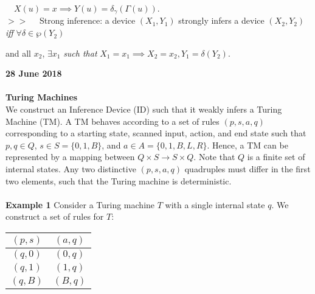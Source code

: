 \documentclass[11pt]{article}
\begin{document}
$ \quad X(u) = x \implies Y(u) = \delta_{\gamma}(\Gamma(u)) $.  \\
$ >> \quad $ Strong inference: a device $ (X_1, Y_1) $ strongly infers a device $ (X_2, Y_2) $ \textit{ iff } $\forall \delta \in \wp(Y_2) $ 

\quad and all $ x_2 $, $ \exists x_1 $ \textit{ such that } $ X_1 = x_1 \implies X_2 = x_2, Y_1 = \delta(Y_2) $. \\

\bigbreak

\textbf{28 June 2018} \\ 
\\
\textbf{Turing Machines} \\ 

We construct an Inference Device (ID) such that it weakly infers a Turing Machine (TM). A TM behaves according to a set of rules $(p, s, a, q)$ corresponding to a starting state, scanned input, action, and end state such that $p, q \in Q$, $s \in S = \{0, 1, B\}$, and $a \in A = \{0, 1, B, L, R\} $. Hence, a TM can be represented by a mapping between $ Q \times S \rightarrow S \times Q $. Note that $ Q $ is a finite set of internal states. Any two distinctive $(p, s, a, q)$ quadruples must differ in the first two elements, such that the Turing machine is deterministic. \\
\\

\textbf{Example 1} Consider a Turing machine $ T $ with a single internal state $ q $. We construct a set of rules for $ T $: 



\begin{center}
\begin{tabular}{ c||c } 

 $ (p, s) $ & $ (a, q) $ \\ 
 \hline
 \hline
 $ (q, 0) $ & $ (0, q) $ \\ 
 \hline
 $ (q, 1) $ & $ (1, q) $ \\ 
 \hline
 $ (q, B) $ & $ (B, q) $ \\ 
 
\end{tabular}
\end{center}
\end{document}
